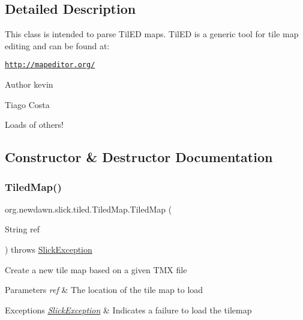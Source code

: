 \subsection{Detailed Description}
This class is intended to parse Til\+ED maps. Til\+ED is a generic tool for tile map editing and can be found at\+:

\href{http://mapeditor.org/}{\tt http\+://mapeditor.\+org/}

\begin{DoxyAuthor}{Author}
kevin 

Tiago Costa 

Loads of others! 
\end{DoxyAuthor}


\subsection{Constructor \& Destructor Documentation}
\mbox{\label{classorg_1_1newdawn_1_1slick_1_1tiled_1_1_tiled_map_a364569bc60c0e5a76a0e0da82c3c2a6a}} 
\subsubsection{\texorpdfstring{Tiled\+Map()}{TiledMap()}\hspace{0.1cm}{\footnotesize\ttfamily [1/5]}}
{\footnotesize\ttfamily org.\+newdawn.\+slick.\+tiled.\+Tiled\+Map.\+Tiled\+Map (\begin{DoxyParamCaption}\item[{String}]{ref }\end{DoxyParamCaption}) throws \mbox{\hyperlink{classorg_1_1newdawn_1_1slick_1_1_slick_exception}{Slick\+Exception}}\hspace{0.3cm}{\ttfamily [inline]}}

Create a new tile map based on a given T\+MX file


\begin{DoxyParams}{Parameters}
{\em ref} & The location of the tile map to load \\
\hline
\end{DoxyParams}

\begin{DoxyExceptions}{Exceptions}
{\em \mbox{\hyperlink{classorg_1_1newdawn_1_1slick_1_1_slick_exception}{Slick\+Exception}}} & Indicates a failure to load the tilemap \\
\hline
\end{DoxyExceptions}

